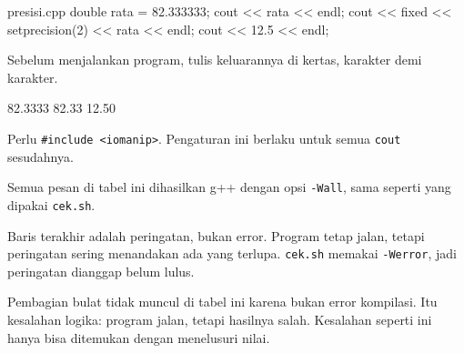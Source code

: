 \documentclass[a4paper]{article}
\begin{document}
\begin{MKode}{presisi.cpp}
double rata = 82.333333;
cout << rata << endl;
cout << fixed << setprecision(2) << rata << endl;
cout << 12.5 << endl;
\end{MKode}
\begin{Tebak}[]
Sebelum menjalankan program, tulis keluarannya di kertas, karakter demi karakter.
\end{Tebak}
\begin{Jawaban}[]
\begin{MKeluaran}[]
82.3333
82.33
12.50
\end{MKeluaran}
Perlu \texttt{\#include <iomanip>}. Pengaturan ini berlaku untuk semua \texttt{cout} sesudahnya.
\end{Jawaban}
Semua pesan di tabel ini dihasilkan g++ dengan opsi \texttt{-Wall}, sama seperti yang dipakai \texttt{cek.sh}.
\par\vspace{4pt}\par\vspace{6pt}
Baris terakhir adalah peringatan, bukan error. Program tetap jalan, tetapi peringatan sering menandakan ada yang terlupa. \texttt{cek.sh} memakai \texttt{-Werror}, jadi peringatan dianggap belum lulus.

Pembagian bulat tidak muncul di tabel ini karena bukan error kompilasi. Itu kesalahan logika: program jalan, tetapi hasilnya salah. Kesalahan seperti ini hanya bisa ditemukan dengan menelusuri nilai.
\end{document}
